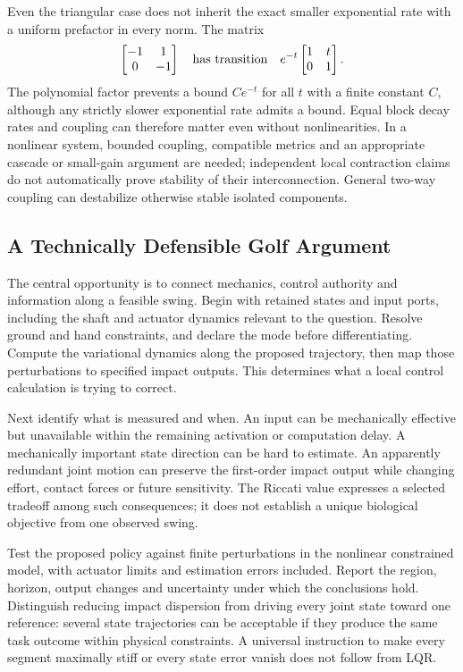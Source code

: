 Even the triangular case does not inherit the exact smaller exponential rate with a uniform prefactor in every norm. The matrix
\begin{equation}
\begin{bmatrix}-1&1\\0&-1\end{bmatrix}
\quad\hbox{has transition}\quad
e^{-t}\begin{bmatrix}1&t\\0&1\end{bmatrix}.
\end{equation}
The polynomial factor prevents a bound $Ce^{-t}$ for all $t$ with a finite constant $C$, although any strictly slower exponential rate admits a bound. Equal block decay rates and coupling can therefore matter even without nonlinearities. In a nonlinear system, bounded coupling, compatible metrics and an appropriate cascade or small-gain argument are needed; independent local contraction claims do not automatically prove stability of their interconnection. General two-way coupling can destabilize otherwise stable isolated components.

\subsection{A Technically Defensible Golf Argument}

The central opportunity is to connect mechanics, control authority and information along a feasible swing. Begin with retained states and input ports, including the shaft and actuator dynamics relevant to the question. Resolve ground and hand constraints, and declare the mode before differentiating. Compute the variational dynamics along the proposed trajectory, then map those perturbations to specified impact outputs. This determines what a local control calculation is trying to correct.

Next identify what is measured and when. An input can be mechanically effective but unavailable within the remaining activation or computation delay. A mechanically important state direction can be hard to estimate. An apparently redundant joint motion can preserve the first-order impact output while changing effort, contact forces or future sensitivity. The Riccati value expresses a selected tradeoff among such consequences; it does not establish a unique biological objective from one observed swing.

Test the proposed policy against finite perturbations in the nonlinear constrained model, with actuator limits and estimation errors included. Report the region, horizon, output changes and uncertainty under which the conclusions hold. Distinguish reducing impact dispersion from driving every joint state toward one reference: several state trajectories can be acceptable if they produce the same task outcome within physical constraints. A universal instruction to make every segment maximally stiff or every state error vanish does not follow from LQR.


